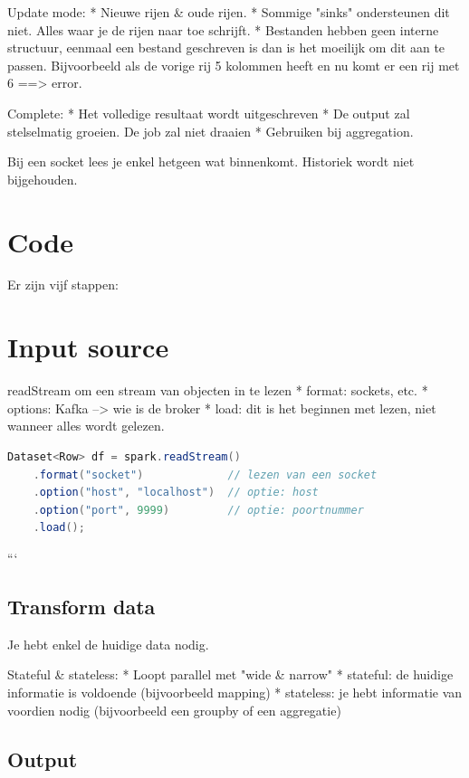 \documentclass[a4paper,10pt,twoside]{report}
\begin{document}
Update mode:
* Nieuwe rijen \& oude rijen.
* Sommige "sinks" ondersteunen dit niet. Alles waar je de rijen naar toe schrijft.
* Bestanden hebben geen interne structuur, eenmaal een bestand geschreven is dan is het moeilijk om dit aan te passen. Bijvoorbeeld als de vorige rij 5 kolommen heeft en nu komt er een rij met 6 ==> error.

Complete:
* Het volledige resultaat wordt uitgeschreven
* De output zal stelselmatig groeien. De job zal niet draaien
* Gebruiken bij aggregation.

Bij een socket lees je enkel hetgeen wat binnenkomt. Historiek wordt niet bijgehouden.

\section{Code}

Er zijn vijf stappen:

\section{Input source}

readStream om een stream van objecten in te lezen
* format: sockets, etc.
* options: Kafka --> wie is de broker
* load: dit is het beginnen met lezen, niet wanneer alles wordt gelezen.

\begin{lstlisting}[language=Java]
Dataset<Row> df = spark.readStream()
	.format("socket")             // lezen van een socket
	.option("host", "localhost")  // optie: host
	.option("port", 9999)         // optie: poortnummer
	.load();
\end{lstlisting}

```

\subsection{Transform data}

Je hebt enkel de huidige data nodig.

Stateful \& stateless:
* Loopt parallel met "wide \& narrow"
* stateful: de huidige informatie is voldoende (bijvoorbeeld mapping)
* stateless: je hebt informatie van voordien nodig (bijvoorbeeld een groupby of een aggregatie)

\subsection{Output}
\end{document}
